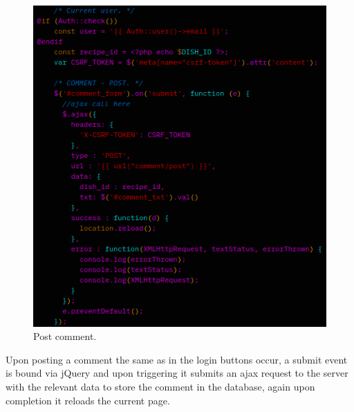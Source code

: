 \documentclass[a4paper]{scrartcl}
\begin{document}
\begin{figure}[H]
  \begin{center}
    \includegraphics[scale=1.0]{images/post_cmt.png}
    \caption{Post comment.}
    \label{fig:post}
  \end{center}
\end{figure}
\noindent
Upon posting a comment the same as in the login buttons occur, a submit event is bound via jQuery
and upon triggering it submits an ajax request to the server with the relevant data to store the comment
in the database, again upon completion it reloads the current page.
\end{document}
